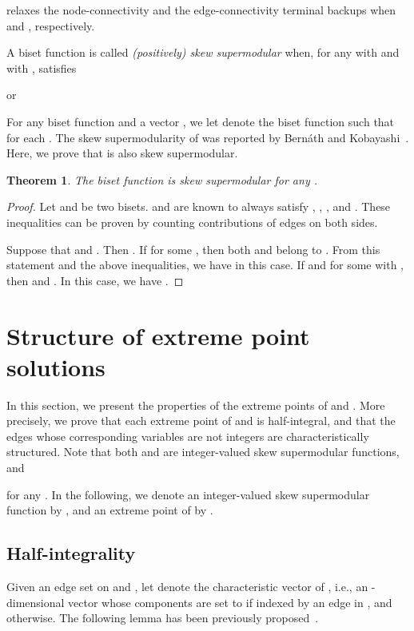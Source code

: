 \documentclass{article}
\newtheorem{theorem}{Theorem}
\begin{document}
relaxes the node-connectivity and the edge-connectivity terminal backups 
when  and , respectively.


A biset function  is called \emph{{\rm (}positively{\rm )} skew supermodular} when, 
for any  with  and  with , 
 satisfies 

or

For any biset function  and a vector
,
we let  denote the biset function such that
 for each .
The skew supermodularity of  was reported by Bern{\'a}th and
Kobayashi~\cite{Bernath2014}. Here, we prove that  is also skew supermodular.

\begin{theorem}\label{thm:skewsupermodular}
The biset function  is skew supermodular for any .
\end{theorem}
\begin{proof}
Let  and  be two bisets.
 and  are known to always satisfy
,
,
,
and
.
These inequalities can be proven by counting contributions of edges on both sides.

Suppose that  and .
Then .
If  for some , then both  and 
 belong to .
From this statement and the above inequalities, we have 
 in this case.
If  and  for some  with , 
then  and .
In this case, we have 
.
\end{proof}





\section{Structure of extreme point solutions}
\label{sec:characterization}

In this section, we present the properties of the extreme points of  and .
More precisely, we prove that each extreme point of  and  is half-integral,
and that the edges whose corresponding variables are not integers are characteristically structured.
Note that both  and  are integer-valued skew supermodular functions, and 

for any . 
In the following, we denote an integer-valued skew supermodular function by ,
and an extreme point of  by .


\subsection{Half-integrality} 

Given an edge set  on  and , let  denote the characteristic
vector of ,
i.e., an -dimensional vector whose components are set to  if indexed by
an edge in , and  otherwise.
The following lemma has been previously proposed~\cite{Cheriyan2006,FleischerJW06}.
\end{document}

